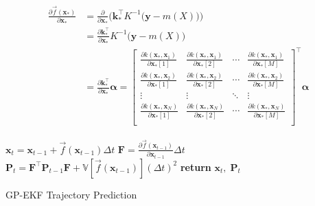 \begin{align}\label{eq:gp_jacobian}
    \begin{split}
        \frac{\partial \vec{f}(\boldsymbol{x}_*)}{\partial \boldsymbol{x}_*} &= \frac{\partial}{\partial \boldsymbol{x}_*} \bigg(\boldsymbol{k}_*^\intercal K^{-1} \big(\boldsymbol{y} - m(X)\big)\bigg)\\
        &= \frac{\partial \boldsymbol{k}_*^\intercal}{\partial \boldsymbol{x}_*} K^{-1} \big(\boldsymbol{y} - m(X)\big)\\
        &= \frac{\partial \boldsymbol{k}_*^\intercal}{\partial \boldsymbol{x}_*} \boldsymbol{\alpha} = \begin{bmatrix}
            \frac{\partial k(\boldsymbol{x}_*, \boldsymbol{x}_1)}{\partial \boldsymbol{x}_*[1]} & \frac{\partial k(\boldsymbol{x}_*, \boldsymbol{x}_1)}{\partial \boldsymbol{x}_*[2]} & \cdots & \frac{\partial k(\boldsymbol{x}_*, \boldsymbol{x}_1)}{\partial \boldsymbol{x}_*[M]} \\
            \frac{\partial k(\boldsymbol{x}_*, \boldsymbol{x}_2)}{\partial \boldsymbol{x}_*[1]} & \frac{\partial k(\boldsymbol{x}_*, \boldsymbol{x}_2)}{\partial \boldsymbol{x}_*[2]} & \cdots & \frac{\partial k(\boldsymbol{x}_*, \boldsymbol{x}_2)}{\partial \boldsymbol{x}_*[M]} \\
            \vdots                                                                              & \vdots                                                                              & \ddots & \vdots                                                                              \\
            \frac{\partial k(\boldsymbol{x}_*, \boldsymbol{x}_N)}{\partial \boldsymbol{x}_*[1]} & \frac{\partial k(\boldsymbol{x}_*, \boldsymbol{x}_N)}{\partial \boldsymbol{x}_*[2]} & \cdots & \frac{\partial k(\boldsymbol{x}_*, \boldsymbol{x}_N)}{\partial \boldsymbol{x}_*[M]} \\
        \end{bmatrix}^\intercal \boldsymbol{\alpha}
    \end{split}
\end{align}

\begin{algorithm}[h]
    \begin{algorithmic}[1]
        \State $\boldsymbol{x}_{t} = \boldsymbol{x}_{t-1} + \vec{f}(\boldsymbol{x}_{t-1}) \Delta t$
        \State $\boldsymbol{F} = \frac{\partial \vec{f}(\boldsymbol{x}_{t-1})}{\partial \boldsymbol{x}_{t-1}} \Delta t$
        \State $\boldsymbol{P}_t = \boldsymbol{F}^\intercal \boldsymbol{P}_{t-1} \boldsymbol{F} +\mathbb{V}[\vec{f}(\boldsymbol{x}_{t-1})] (\Delta t)^2$
        \State \textbf{return} $\boldsymbol{x}_t, \; \boldsymbol{P}_t$
        \EndProcedure
    \end{algorithmic}
    \caption{GP-EKF Trajectory Prediction}
    \label{alg:gp_ekf_prediction}
\end{algorithm}

